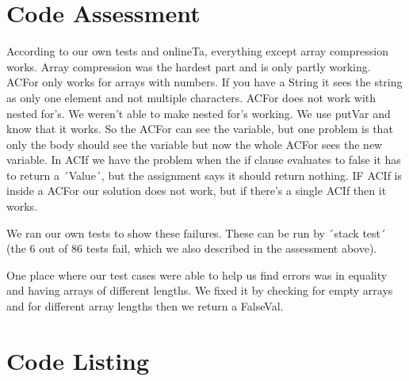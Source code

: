 \documentclass[12pt,a4paper]{article}
\begin{document}
\section{Code Assessment}
According to our own tests and onlineTa, everything except array compression works.
Array compression was the hardest part and is only partly working. ACFor only works for arrays with numbers. If you have a String it sees the string as only one element and not multiple characters. ACFor does not work with nested for's. We weren't able to make nested for's working. We use putVar and know that it works. So the ACFor can see the variable, but one problem is that only the body should see the variable but now the whole ACFor sees the new variable.
In ACIf we have the problem when the if clause evaluates to false it has to return a ´Value´, but the assignment says it should return nothing. IF ACIf is inside a ACFor our solution does not work, but if there's a single ACIf then it works.

We ran our own tests to show these failures. These can be run by ´stack test´ (the 6 out of 86 tests fail, which we also described in the assessment above). 

One place where our test cases were able to help us find errors was in equality and having arrays of different lengths. We fixed it by checking for empty arrays and for different array lengths then  we return a FalseVal.

\appendix
\section{Code Listing}

\inputminted{haskell}{handin/src/SubsInterpreter.hs}
\end{document}
